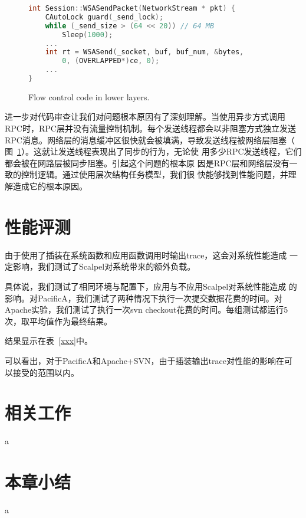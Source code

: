 \begin{figure}
\centering
\begin{lstlisting}[language=C++]
int Session::WSASendPacket(NetworkStream * pkt) {    
    CAutoLock guard(_send_lock);
    while (_send_size > (64 << 20)) // 64 MB
        Sleep(1000);
    ...
    int rt = WSASend(_socket, buf, buf_num, &bytes,
        0, (OVERLAPPED*)ce, 0);
    ...
}
\end{lstlisting}
\caption{Flow control code in lower layers.}
\label{fig:flow_control_code}
\end{figure}


进一步对代码审查让我们对问题根本原因有了深刻理解。当使用异步方式调用
RPC时，RPC层并没有流量控制机制。每个发送线程都会以非阻塞方式独立发送
RPC消息。网络层的消息缓冲区很快就会被填满，导致发送线程被网络层阻塞（
图~\ref{fig:flow_control_code}）。这就让发送线程表现出了同步的行为，无论使
用多少RPC发送线程，它们都会被在网路层被同步阻塞。引起这个问题的根本原
因是RPC层和网络层没有一致的控制逻辑。通过使用层次结构任务模型，我们很
快能够找到性能问题，并理解造成它的根本原因。


\section{性能评测}

由于使用了插装在系统函数和应用函数调用时输出trace，这会对系统性能造成
一定影响，我们测试了Scalpel对系统带来的额外负载。

具体说，我们测试了相同环境与配置下，应用与不应用Scalpel对系统性能造成
的影响。对PacificA，我们测试了两种情况下执行一次提交数据花费的时间。对
Apache实验，我们测试了执行一次svn checkout花费的时间。每组测试都运行5
次，取平均值作为最终结果。

结果显示在表~\ref{xxx}中。


可以看出，对于PacificA和Apache+SVN，由于插装输出trace对性能的影响在可
以接受的范围以内。

\section{相关工作}

a

\section{本章小结}

a

